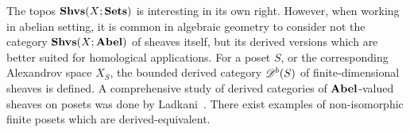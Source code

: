 \begin{rem}\label{remDerivedCatOnPoset}
The topos $\mathbf{Shvs}(X;\mathbf{Sets})$ is interesting in its own right. However, when working in abelian setting, it is common in algebraic geometry to consider not the category $\mathbf{Shvs}(X;\mathbf{Abel})$ of sheaves itself, but its derived versions which are better suited for homological applications. For a poset $S$, or the corresponding Alexandrov space $X_S$, the bounded derived category $\mathscr{D}^b(S)$ of finite-dimensional sheaves is defined. A comprehensive study of derived categories of $\mathbf{Abel}$-valued sheaves on posets was done by Ladkani~\cite{LADKANI2008435}. There exist examples of non-isomorphic finite posets which are derived-equivalent.
\end{rem}
